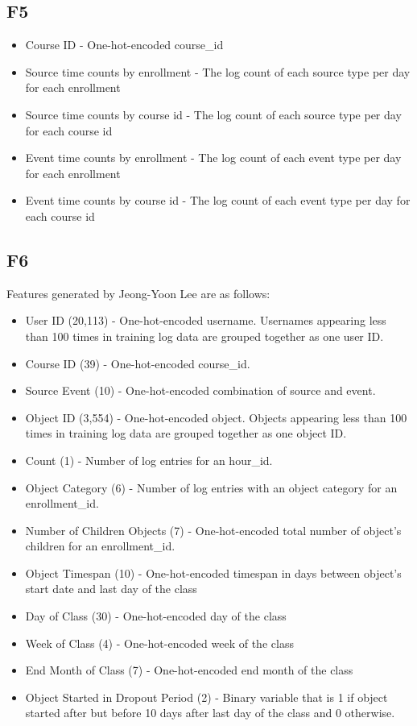 \subsection{F5}
\begin{itemize}
  \setlength\itemsep{0em}
  \item Course ID - One-hot-encoded course\_id
  \item Source time counts  by enrollment - The log count of each source type per day for each enrollment
  \item Source time counts by course id - The log count of each source type per day for each course id
  \item Event time counts by enrollment - The log count of each event type per day for each enrollment
  \item Event time counts by course id - The log count of each event type per day for each course id

\end{itemize}

\subsection{F6}
Features generated by Jeong-Yoon Lee are as follows:

\begin{itemize}
  \setlength\itemsep{0em}
  \item User ID (20,113) - One-hot-encoded username. Usernames appearing less than 100 times in training log data are grouped together as one user ID. 
  \item Course ID (39) - One-hot-encoded course\_id.
  \item Source Event (10) - One-hot-encoded combination of source and event.
  \item Object ID (3,554) - One-hot-encoded object.  Objects appearing less than 100 times in training log data are grouped together as one object ID.
  \item Count (1) - Number of log entries for an hour\_id.
  \item Object Category (6) - Number of log entries with an object category for an enrollment\_id.
  \item Number of Children Objects (7) - One-hot-encoded total number of object's children for an enrollment\_id.
  \item Object Timespan (10) - One-hot-encoded timespan in days between object's start date and last day of the class
  \item Day of Class (30) - One-hot-encoded day of the class
  \item Week of Class (4) - One-hot-encoded week of the class
  \item End Month of Class (7) - One-hot-encoded end month of the class
  \item Object Started in Dropout Period (2) - Binary variable that is 1 if object started after but before 10 days after last day of the class and 0 otherwise.
\end{itemize}

